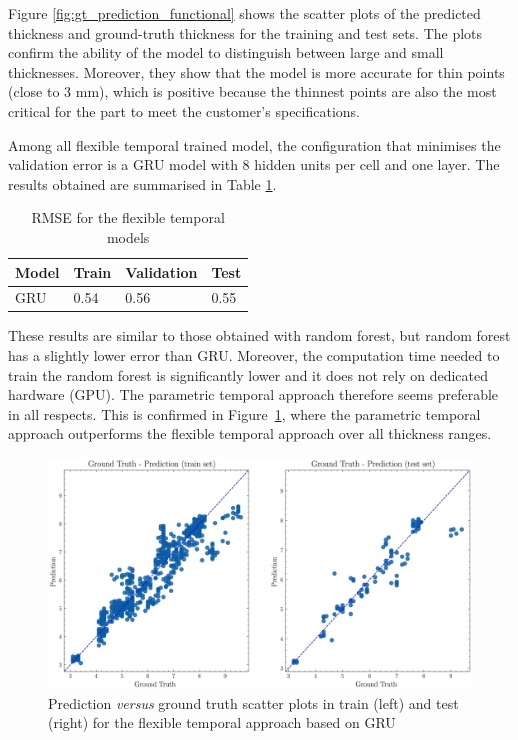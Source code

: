Figure \ref{fig:gt_prediction_functional} shows the scatter plots of the predicted thickness and ground-truth thickness for the training and test sets. The plots confirm the ability of the model to distinguish between large and small thicknesses. Moreover, they show that the model is more accurate for thin points (close to 3 mm), which is positive because the thinnest points are also the most critical for the part to meet the customer's specifications.

Among all flexible temporal trained model, the configuration that minimises the validation error is a GRU model with 8 hidden units per cell and one layer. The results obtained are summarised in Table \ref{tab:temporal_model_results}.
%
\begin{table}
    \centering
    \caption{RMSE for the flexible temporal models}
    \begin{tabular}{llll}
    \toprule
    \textbf{Model} & \textbf{Train}  & \textbf{Validation}  & \textbf{Test}  \\
    \midrule
    GRU & {0.54} & {0.56} & {0.55} \\
    \bottomrule
    \end{tabular}
    \label{tab:temporal_model_results}
\end{table}
%
These results are similar to those obtained with random forest, but random forest has a slightly lower error than GRU. Moreover, the computation time needed to train the random forest is significantly lower and it does not rely on dedicated hardware (GPU). The parametric temporal approach therefore seems preferable in all respects. This is confirmed in Figure~\ref{fig:gt_prediction_temporal}, where the parametric temporal approach outperforms the flexible temporal approach over all thickness ranges.
\begin{figure}
\centering
\includegraphics[scale=0.48]{images/chapter_4/gt_temporal.eps}
\caption{Prediction \textit{versus} ground truth scatter plots in train (left) and test (right) for the flexible temporal approach based on GRU}
\label{fig:gt_prediction_temporal}
\end{figure}

